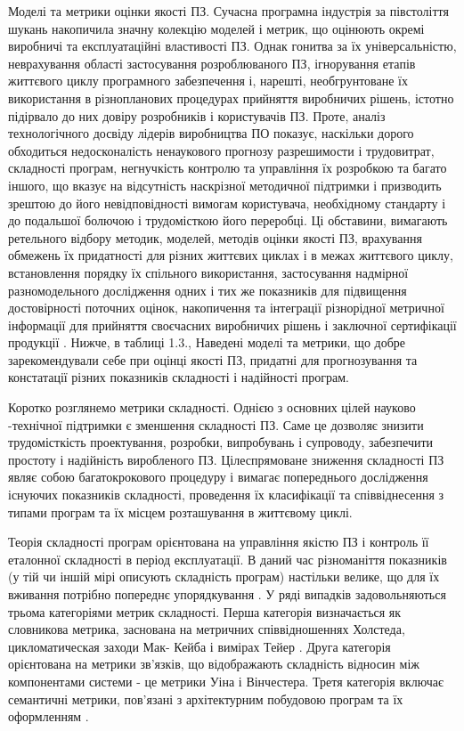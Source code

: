 Моделі та метрики оцінки якості ПЗ.
Сучасна програмна індустрія за півстоліття шукань накопичила значну колекцію моделей і метрик, що оцінюють окремі виробничі та експлуатаційні властивості ПЗ. Однак гонитва за їх універсальністю, неврахування області застосування розроблюваного ПЗ, ігнорування етапів життєвого циклу програмного забезпечення і, нарешті, необгрунтоване їх використання в різнопланових процедурах прийняття виробничих рішень, істотно підірвало до них довіру розробників і користувачів ПЗ.
Проте, аналіз технологічного досвіду лідерів виробництва ПО показує, наскільки дорого обходиться недосконалість ненаукового прогнозу разрешимости і трудовитрат, складності програм, негнучкість контролю та управління їх розробкою та багато іншого, що вказує на відсутність наскрізної методичної підтримки і призводить зрештою до його невідповідності вимогам користувача, необхідному стандарту і до подальшої болючою і трудомісткою його переробці. Ці обставини, вимагають ретельного відбору методик, моделей, методів оцінки якості ПЗ, врахування обмежень їх придатності для різних життєвих циклах і в межах життєвого циклу, встановлення порядку їх спільного використання, застосування надмірної разномодельного дослідження одних і тих же показників для підвищення достовірності поточних оцінок, накопичення та інтеграції різнорідної метричної інформації для прийняття своєчасних виробничих рішень і заключної сертифікації продукції . Нижче, в таблиці 1.3., Наведені моделі та метрики, що добре зарекомендували себе при оцінці якості ПЗ, придатні для прогнозування та констатації різних показників складності і надійності програм.

Коротко розглянемо метрики складності. Однією з основних цілей науково -технічної підтримки є зменшення складності ПЗ. Саме це дозволяє знизити трудомісткість проектування, розробки, випробувань і супроводу, забезпечити простоту і надійність виробленого ПЗ. Цілеспрямоване зниження складності ПЗ являє собою багатокрокового процедуру і вимагає попереднього дослідження існуючих показників складності, проведення їх класифікації та співвіднесення з типами програм та їх місцем розташування в життєвому циклі.

Теорія складності програм орієнтована на управління якістю ПЗ і контроль її еталонної складності в період експлуатації. В даний час різноманіття показників (у тій чи іншій мірі описують складність програм) настільки велике, що для їх вживання потрібно попереднє упорядкування . У ряді випадків задовольняються трьома категоріями метрик складності. Перша категорія визначається як словникова метрика, заснована на метричних співвідношеннях Холстеда, цикломатическая заходи Мак- Кейба і вимірах Тейер . Друга категорія орієнтована на метрики зв'язків, що відображають складність відносин між компонентами системи - це метрики Уіна і Вінчестера. Третя категорія включає семантичні метрики, пов'язані з архітектурним побудовою програм та їх оформленням .

